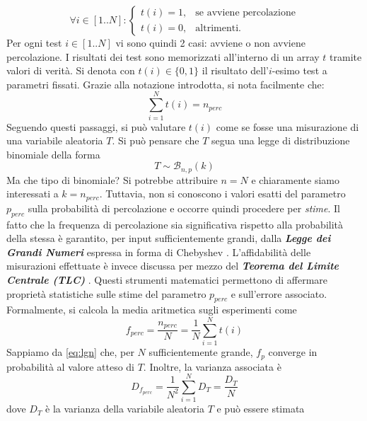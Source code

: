 \begin{equation}
    \forall i \in [1..N] : 
    \begin{cases}
        t(i) = 1 ,& \text{se avviene percolazione} \\
        t(i) = 0 ,& \text{altrimenti}.
    \end{cases}
\end{equation}
Per ogni test $i \in [1..N]$ vi sono quindi 2 casi: avviene o non avviene percolazione.
I risultati dei test sono memorizzati all'interno di un array $t$ tramite valori di verità. 
Si denota con $t(i) \in \{0,1\}$ il risultato dell'$i$-esimo test a parametri fissati.
Grazie alla notazione introdotta, si nota facilmente che:
\begin{equation}
    \sum_{i=1}^{N} t(i) = n_{perc}
\end{equation}
Seguendo questi passaggi, si può valutare $t(i)$ come se fosse una misurazione di una 
variabile aleatoria $T$.
Si può pensare che $T$ segua una legge di distribuzione binomiale della forma
\begin{equation*}
    T \sim \mathcal{B}_{n,p}(k)
\end{equation*} 
Ma che tipo di binomiale? Si potrebbe attribuire $n=N$ e chiaramente siamo interessati a $k=n_{perc}$.
Tuttavia, non si conoscono i valori esatti del parametro $p_{perc}$ sulla probabilità di percolazione e 
occorre quindi procedere per \textit{stime}.
Il fatto che la frequenza di percolazione sia significativa rispetto alla probabilità 
della stessa è garantito, per input sufficientemente grandi, dalla \textbf{\textit{Legge dei Grandi Numeri}}
espressa in forma di Chebyshev \cite{big-numbers, chebyshev}.
L'affidabilità delle misurazioni effettuate è invece discussa per mezzo del 
\textbf{\textit{Teorema del Limite Centrale (TLC)}} \cite{tlc}.
Questi strumenti matematici permettono di affermare proprietà statistiche sulle 
stime del parametro $p_{perc}$ e sull'errore associato. Formalmente, si calcola 
la media aritmetica sugli esperimenti come 
\begin{equation}
    f_{perc} = \frac{n_{perc}}{N} = \frac{1}{N} \sum_{i=1}^{N} t(i)
\end{equation}
Sappiamo da \ref{eq:lgn} che, per $N$ sufficientemente grande, $f_p$ converge 
in probabilità al valore atteso di $T$. Inoltre, la varianza associata è
\begin{equation}
    D_{f_{perc}} = \frac{1}{N^2} \sum_{i=1}^{N} {D}_T = \frac{{D}_T}{N}
\end{equation}
dove $D_T$ è la varianza della variabile aleatoria $T$ e può essere stimata 
